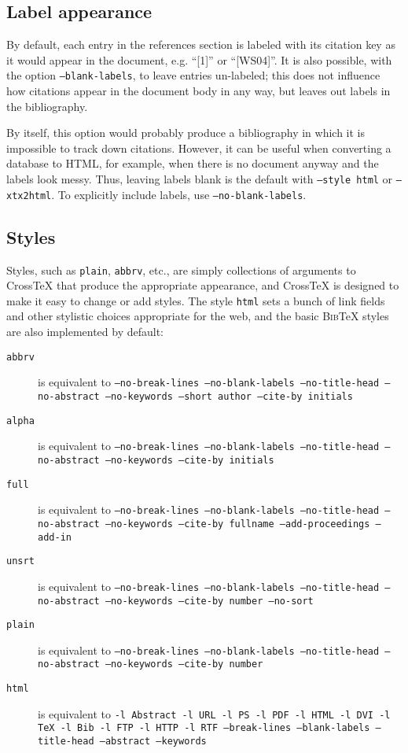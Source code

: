 \documentclass{article}
\newcommand{\XTX}{Cross\TeX}
\newcommand{\BibTeX}{\textsc{Bib}\TeX}
\begin{document}
\subsection{Label appearance}

By default, each entry in the references section is labeled with
its citation key as it would appear in the document, e.g. ``[1]'' or
``[WS04]''.  It is also possible, with the option \texttt{--blank-labels},
to leave entries un-labeled; this does not influence how citations
appear in the document body in any way, but leaves out labels in the
bibliography.

By itself, this option would probably produce a bibliography in which it
is impossible to track down citations.  However, it can be useful when
converting a database to HTML, for example, when there is no document
anyway and the labels look messy.  Thus, leaving labels blank is the
default with \texttt{--style~html} or \texttt{--xtx2html}.  To explicitly
include labels, use \texttt{--no-blank-labels}.

\subsection{Styles}

Styles, such as \texttt{plain}, \texttt{abbrv}, etc., are simply
collections of arguments to \XTX{} that produce the appropriate
appearance, and \XTX{} is designed to make it easy to change or add
styles.  The style \texttt{html} sets a bunch of link fields and other
stylistic choices appropriate for the web, and the basic \BibTeX{}
styles are also implemented by default:

\begin{description} \item[\texttt{abbrv}] is equivalent to
  \texttt{--no-break-lines --no-blank-labels --no-title-head --no-abstract
  --no-keywords --short author --cite-by initials}
\item[\texttt{alpha}] is equivalent to
  \texttt{--no-break-lines --no-blank-labels --no-title-head --no-abstract
  --no-keywords --cite-by initials}
\item[\texttt{full}] is equivalent to
  \texttt{--no-break-lines --no-blank-labels --no-title-head --no-abstract
  --no-keywords --cite-by fullname --add-proceedings --add-in}
\item[\texttt{unsrt}] is equivalent to
  \texttt{--no-break-lines --no-blank-labels --no-title-head --no-abstract
  --no-keywords --cite-by number --no-sort}
\item[\texttt{plain}] is equivalent to
  \texttt{--no-break-lines --no-blank-labels --no-title-head --no-abstract
  --no-keywords --cite-by number}
\item[\texttt{html}] is equivalent to
  \texttt{-l Abstract -l URL -l PS -l PDF -l HTML -l DVI -l TeX -l
  Bib -l FTP -l HTTP -l RTF --break-lines --blank-labels --title-head
  --abstract --keywords}
\end{description}
\end{document}
